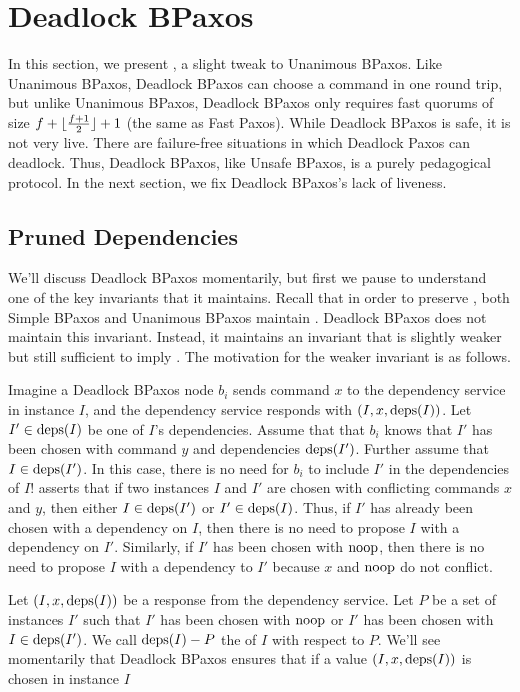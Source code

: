 \section{Deadlock BPaxos}
In this section, we present , a slight tweak to
Unanimous BPaxos. Like Unanimous BPaxos, Deadlock BPaxos can choose a command
in one round trip, but unlike Unanimous BPaxos, Deadlock BPaxos only requires
fast quorums of size $f + \lfloor\frac{f + 1}{2}\rfloor + 1$ (the same as Fast Paxos).
%
While Deadlock BPaxos is safe, it is not very live. There are failure-free
situations in which Deadlock Paxos can deadlock. Thus, Deadlock BPaxos, like
Unsafe BPaxos, is a purely pedagogical protocol. In the next section, we fix
Deadlock BPaxos's lack of liveness.

\subsection{Pruned Dependencies}
We'll discuss Deadlock BPaxos momentarily, but first we pause to understand one
of the key invariants that it maintains. Recall that in order to preserve
, both Simple BPaxos and Unanimous BPaxos maintain
.
%
Deadlock BPaxos does not maintain this invariant. Instead, it maintains an
invariant that is slightly weaker but still sufficient to imply
. The motivation for the weaker invariant is as
follows.

Imagine a Deadlock BPaxos node $b_i$ sends command $x$ to the dependency
service in instance $I$, and the dependency service responds with $(I, x,
\text{deps}(I))$. Let $I' \in \text{deps}(I)$ be one of $I$'s dependencies. Assume that
that $b_i$ knows that $I'$ has been chosen with command $y$ and dependencies
$\text{deps}(I')$. Further assume that $I \in \text{deps}(I')$. In this case, there is no
need for $b_i$ to include $I'$ in the dependencies of $I$!
 asserts that if two instances $I$ and $I'$ are
chosen with conflicting commands $x$ and $y$, then either $I \in \text{deps}(I')$ or
$I' \in \text{deps}(I)$. Thus, if $I'$ has already been chosen with a dependency on
$I$, then there is no need to propose $I$ with a dependency on $I'$.
%
Similarly, if $I'$ has been chosen with $\text{noop}$, then there is no need to
propose $I$ with a dependency to $I'$ because $x$ and $\text{noop}$ do not conflict.

Let $(I, x, \text{deps}(I))$ be a response from the dependency service. Let $P$ be a
set of instances $I'$ such that $I'$ has been chosen with $\text{noop}$ or $I'$ has
been chosen with $I \in \text{deps}(I')$. We call $\text{deps}(I) - P$ the  of $I$ with respect to $P$. We'll see momentarily that Deadlock
BPaxos ensures that if a value $(I, x, \text{deps}(I))$ is chosen in instance $I$

